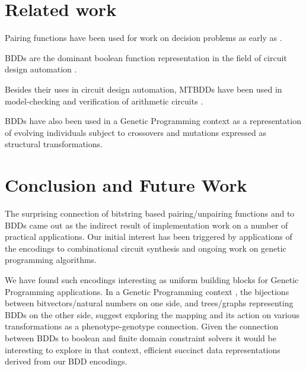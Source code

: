 \documentclass[]{INCLUDES/llncs}
\begin{document}
\section{Related work} \label{related}
Pairing functions have been used for work on decision problems as early 
as \cite{robinson50}. 

BDDs are the dominant boolean function representation in
the field of circuit design automation
\cite{DBLP:journals/jcsc/MeinelT99}.

Besides their uses in circuit design automation,
MTBDDs have been used in model-checking and
verification of arithmetic circuits \cite{DBLP:journals/fmsd/FujitaMY97,CBGP08}.

BDDs have also been used in a Genetic Programming context
\cite{DBLP:conf/ices/SakanashiHIK96}
as a representation of evolving individuals subject to crossovers 
and mutations expressed as structural transformations.

\section{Conclusion and Future Work} \label{concl}
The surprising connection of bitstring based pairing/unpairing functions and
to BDDs came out as the indirect result of implementation
work on a number of practical applications.
Our initial interest has been triggered by applications of the 
encodings to combinational circuit synthesis \cite{iclp07,cf08}
and ongoing work on genetic programming algorithms.

We have found such encodings interesting as uniform 
building blocks for Genetic Programming applications.
In a Genetic Programming context \cite{koza92}, 
the bijections between bitvectors/natural numbers 
on one side, and trees/graphs representing BDDs on the other side, 
suggest exploring the mapping and its action on various
transformations as a phenotype-genotype connection. 
Given the connection between BDDs to
boolean and finite domain constraint solvers
it would be interesting to explore in that context,
efficient succinct data representations
derived from our BDD encodings.

%
%


\end{document}

